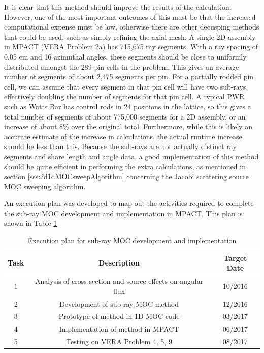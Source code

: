 It is clear that this method should improve the results of the calculation.  However, one of the most important outcomes of this must be that the increased computational expense must be low, otherwise there are other decusping methods that could be used, such as simply refining the axial mesh.  A single 2D assembly in MPACT (VERA Problem 2a) has 715,675 ray segments.  With a ray spacing of 0.05 cm and 16 azimuthal angles, these segments should be close to uniformly distributed amongst the 289 pin cells in the problem.  This gives an average number of segments of about 2,475 segments per pin.  For a partially rodded pin cell, we can assume that every segment in that pin cell will have two sub-rays, effectively doubling the number of segments for that pin cell.  A typical PWR such as Watts Bar has control rods in 24 positions in the lattice, so this gives a total number of segments of about 775,000 segments for a 2D assembly, or an increase of about 8\% over the original total.  Furthermore, while this is likely an accurate estimate of the increase in calculations, the actual runtime increase should be less than this.  Because the sub-rays are not actually distinct ray segments and share length and angle data, a good implementation of this method should be quite efficient in performing the extra calculations, as mentioned in section \ref{sss:2d1dMOCsweepAlgorithm} concerning the Jacobi scattering source MOC sweeping algorithm.

An execution plan was developed to map out the activities required to complete the sub-ray MOC development and implementation in MPACT.  This plan is shown in Table \ref{t:subrayExecutionPlan}

\begin{table}[h]
  \centering
  \caption{Execution plan for sub-ray MOC development and implementation}\label{t:subrayExecutionPlan}
  \begin{tabular}{|c|c|c|}\toprule
    Task & Description & Target Date \\\midrule
    1 & Analysis of cross-section and source effects on angular flux & 10/2016 \\\midrule
    2 & Development of sub-ray MOC method & 12/2016 \\\midrule
    3 & Prototype of method in 1D MOC code & 03/2017 \\\midrule
    4 & Implementation of method in MPACT & 06/2017 \\\midrule
    5 & Testing on VERA Problem 4, 5, 9 & 08/2017 \\\bottomrule
  \end{tabular}
\end{table}